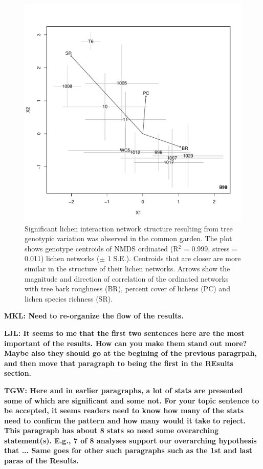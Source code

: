 \documentclass[9pt,twocolumn,twoside,lineno]{pnas-new}
\begin{document}
{\begin{figure}[ht]
\centering
\includegraphics[width=\linewidth]{cn_chplot.pdf}
\caption{Significant lichen interaction network structure resulting
  from tree genotypic variation was observed in the common garden.
  The plot shows genotype centroids of NMDS ordinated (R$^2$ = 0.999,
  stress = 0.011) lichen networks ($\pm$ 1 S.E.). Centroids that are
  closer are more similar in the structure of their lichen
  networks. Arrows show the magnitude and direction of correlation of
  the ordinated networks with tree bark roughness (BR), percent cover
  of lichens (PC) and lichen species richness (SR).}
\label{fig:cn_ch_plot}
\end{figure}

\textbf{MKL: Need to re-organize the flow of the results.}


\textbf{LJL: It seems to me that the first two sentences here are the
  most important of the results. How can you make them stand out more?
  Maybe also they should go at the begining of the previous paragrpah,
  and then move that paragraph to being the first in the REsults
  section.}

\textbf{TGW: Here and in earlier paragraphs, a lot of stats are
  presented some of which are significant and some not.  For your
  topic sentence to be accepted, it seems readers need to know how
  many of the stats need to confirm the pattern and how many would it
  take to reject.  This paragraph has about 8 stats so need some
  overarching statement(s).  E.g., 7 of 8 analyses support our
  overarching hypothesis that ...  Same goes for other such paragraphs
  such as the 1st and last paras of the Results.}



}
\end{document}
